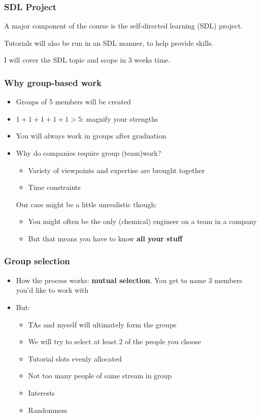\begin{frame}\frametitle{SDL Project}
	A major component of the course is the self-directed learning (SDL) project.

	\vspace{12pt}
	Tutorials will also be run in an SDL manner, to help provide skills.

	\vspace{12pt}
	I will cover the SDL topic and scope in 3 weeks time.
\end{frame}

\begin{frame}\frametitle{Why group-based work}
	\begin{itemize}
		\item	Groups of 5 members will be created
		\item	$1+1+1+1+1 > 5$: magnify your strengths
		\item	You will always work in groups after graduation
		\item	Why do companies require group (team)work? 
		\begin{itemize}
			\item	Variety of viewpoints and expertise are brought together
			\item	Time constraints
		\end{itemize}
		\vspace{12pt}
		\pause
		Our case might be a little unrealistic though:
		\begin{itemize}
			\item	You might often be the only (chemical) engineer on a team in a company
			\item	But that means you have to know \textbf{all your stuff}
		\end{itemize}
	\end{itemize}
\end{frame}

\begin{frame}\frametitle{Group selection}
	\begin{itemize}
		\item	How the process works: \textbf{mutual selection}. You get to name 3 members you'd like to work with
		\item	But:
		\begin{itemize}
			\item	TAs and myself will ultimately form the groups
			\item	We will try to select at least 2 of the people you choose
			\item	Tutorial slots evenly allocated
			\item	Not too many people of same stream in group
			\item	Interests
			\item	Randomness
		\end{itemize}
	\end{itemize}
\end{frame}

